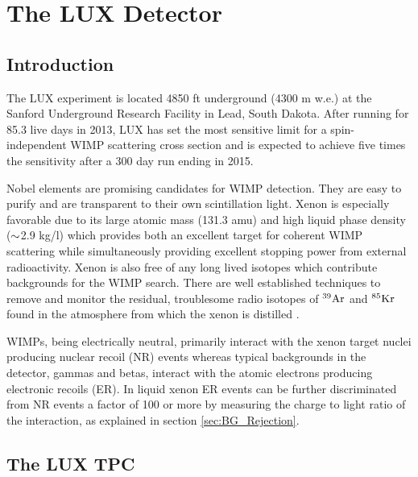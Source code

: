 

\renewcommand{\thechapter}{2}

\chapter{The LUX Detector}
\label{Ch:2}

\section{Introduction}

The LUX experiment is located 4850 ft underground (4300 m w.e.) at the Sanford Underground Research Facility in Lead, South Dakota. After running for 85.3 live days in 2013, LUX has set the most sensitive limit for a spin-independent WIMP scattering cross section \cite{LUX_PRL} and is expected to achieve five times the sensitivity after a 300 day run ending in 2015. 

Nobel elements are promising candidates for WIMP detection. They are easy to purify and are transparent to their own scintillation light. Xenon is especially favorable due to its  large atomic mass (131.3 amu) and high liquid phase density ($\rm \sim$2.9 kg/l) which provides both an excellent target for coherent WIMP scattering while simultaneously providing excellent stopping power from external radioactivity. Xenon is also free of any long lived isotopes which contribute backgrounds for the WIMP search. There are well established techniques to remove and monitor the residual, troublesome radio isotopes of $\rm ^{39}Ar$ and $\rm^{85}Kr$ found in the atmosphere from which the xenon is distilled \cite{Aprile_LXe_overview} \cite{Kr_ppt_Dobi} \cite{lux_kr_removal} \cite{xmass_kr_removal}.
 
WIMPs, being electrically neutral, primarily interact with the xenon target nuclei producing nuclear recoil (NR) events whereas typical backgrounds in the detector, gammas and betas, interact with the atomic electrons producing electronic recoils (ER). In liquid xenon ER events can be further discriminated from NR events a factor of 100 or more by measuring the charge to light ratio of the interaction, as explained in section \ref{sec:BG_Rejection}.


\section{The LUX TPC}

